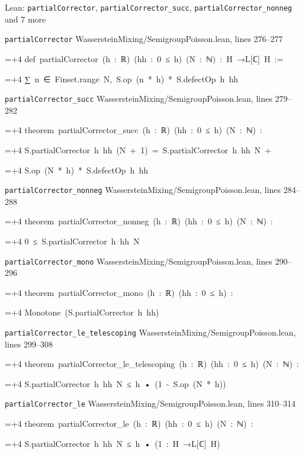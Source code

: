\documentclass[11pt,a4paper]{report}
\newlength{\leancharwidth}
\newenvironment{leancode}{\par\smallskip\begingroup\ttfamily\footnotesize\raggedright
  \settowidth{\leancharwidth}{M}\setlength{\parskip}{0pt}\setlength{\parindent}{0pt}
  \frenchspacing}{\par\endgroup\smallskip}
\newcommand{\leanline}[2]{\hangindent=\dimexpr#1\leancharwidth+4\leancharwidth\relax
  \hangafter=1\noindent\hspace*{#1\leancharwidth}#2\par}
\newcommand{\leansource}[1]{\par{\footnotesize\color{leanmuted}#1}\par}
\begin{document}
\begin{leanbox}{Lean: \texttt{partialCorrector}, \texttt{partialCorrector\_\allowbreak{}succ}, \texttt{partialCorrector\_\allowbreak{}nonneg} and 7 more}
\leansource{\texttt{partialCorrector} \quad WassersteinMixing/\allowbreak{}SemigroupPoisson.lean, lines 276–277}
\begin{leancode}
\leanline{0}{def\ partialCorrector\ (h\ :\ ℝ)\ (hh\ :\ 0\ ≤\ h)\ (N\ :\ ℕ)\ :\ H\ →L[ℂ]\ H\ :=}
\leanline{2}{∑\ n\ ∈\ Finset.range\ N,\ S.op\ (n\ *\ h)\ *\ S.defectOp\ h\ hh}
\end{leancode}
\leansource{\texttt{partialCorrector\_\allowbreak{}succ} \quad WassersteinMixing/\allowbreak{}SemigroupPoisson.lean, lines 279–282}
\begin{leancode}
\leanline{0}{theorem\ partialCorrector\_succ\ (h\ :\ ℝ)\ (hh\ :\ 0\ ≤\ h)\ (N\ :\ ℕ)\ :}
\leanline{4}{S.partialCorrector\ h\ hh\ (N\ +\ 1)\ =\ S.partialCorrector\ h\ hh\ N\ +}
\leanline{6}{S.op\ (N\ *\ h)\ *\ S.defectOp\ h\ hh}
\end{leancode}
\leansource{\texttt{partialCorrector\_\allowbreak{}nonneg} \quad WassersteinMixing/\allowbreak{}SemigroupPoisson.lean, lines 284–288}
\begin{leancode}
\leanline{0}{theorem\ partialCorrector\_nonneg\ (h\ :\ ℝ)\ (hh\ :\ 0\ ≤\ h)\ (N\ :\ ℕ)\ :}
\leanline{4}{0\ ≤\ S.partialCorrector\ h\ hh\ N}
\end{leancode}
\leansource{\texttt{partialCorrector\_\allowbreak{}mono} \quad WassersteinMixing/\allowbreak{}SemigroupPoisson.lean, lines 290–296}
\begin{leancode}
\leanline{0}{theorem\ partialCorrector\_mono\ (h\ :\ ℝ)\ (hh\ :\ 0\ ≤\ h)\ :}
\leanline{4}{Monotone\ (S.partialCorrector\ h\ hh)}
\end{leancode}
\leansource{\texttt{partialCorrector\_\allowbreak{}le\_\allowbreak{}telescoping} \quad WassersteinMixing/\allowbreak{}SemigroupPoisson.lean, lines 299–308}
\begin{leancode}
\leanline{0}{theorem\ partialCorrector\_le\_telescoping\ (h\ :\ ℝ)\ (hh\ :\ 0\ ≤\ h)\ (N\ :\ ℕ)\ :}
\leanline{4}{S.partialCorrector\ h\ hh\ N\ ≤\ h\ •\ (1\ -\ S.op\ (N\ *\ h))}
\end{leancode}
\leansource{\texttt{partialCorrector\_\allowbreak{}le} \quad WassersteinMixing/\allowbreak{}SemigroupPoisson.lean, lines 310–314}
\begin{leancode}
\leanline{0}{theorem\ partialCorrector\_le\ (h\ :\ ℝ)\ (hh\ :\ 0\ ≤\ h)\ (N\ :\ ℕ)\ :}
\leanline{4}{S.partialCorrector\ h\ hh\ N\ ≤\ h\ •\ (1\ :\ H\ →L[ℂ]\ H)}

\end{leancode}
\end{leanbox}
\end{document}
